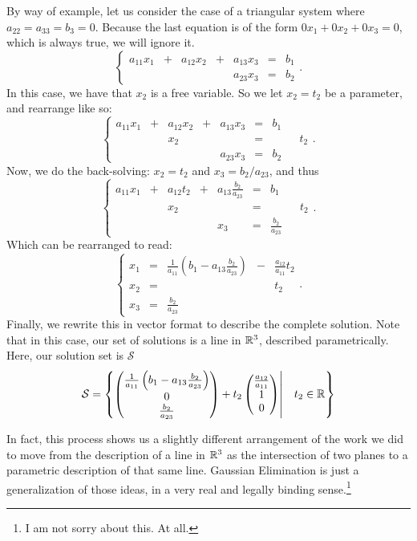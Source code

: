 \documentclass[00-livre-main.tex]{subfiles}
\begin{document}
By way of example, let us consider the case of a triangular system where $a_{22}=a_{33} =b_3=0$. Because the last equation is of the form $0x_1 + 0x_2+0x_3 = 0$, which is always true, we will ignore it.
\[
\left\{\begin{array}{rrrrrrr}
a_{11}x_1 & + & a_{12} x_2 & + & a_{13}x_3 & = & b_1 \\
& &  &  & a_{23}x_3 & = & b_2 
\end{array}\right. .
\]
In this case, we have that $x_2$ is a free variable. So we let $x_2=t_2$ be a parameter, and rearrange like so:
\[
\left\{\begin{array}{rrrrrrrrr}
a_{11}x_1 & + & a_{12}x_2 & + & a_{13}x_3 & = & b_1 &&\\
& & x_2 & & &= & & & t_2  \\
& & & & a_{23}x_3 & = & b_2 &&
\end{array}\right. .
\]
Now, we do the back-solving: $x_2 = t_2$ and $x_3 = b_2 / a_{23}$, and thus
\[
\left\{
\begin{array}{rrrrrrrrr}
a_{11}x_1 & + & a_{12}t_2 & + & a_{13}\frac{b_2}{a_{23}} & = & b_1 &  & \\
& & x_2 & & & = & & & t_2  \\
& & & & x_3 & = & \frac{b_2}{a_{23}} &&
\end{array}\right. .
\]
Which can be rearranged to read:
\[
\left\{
\begin{array}{rrcrr}
x_1 & = & \frac{1}{a_{11}}\left(b_1 -a_{13}\frac{b_2}{a_{23}}\right) & - & \frac{a_{12}}{a_{11}}t_2\\
x_2 & = & & & t_2\\
x_3 & = & \frac{b_2}{a_{23}} &&
\end{array}\right. .
\]
Finally, we rewrite this in vector format to describe the complete solution. Note that in this case, our set of solutions is a line in $\mathbb{R}^3$, described parametrically. Here, our solution set is $\mathcal{S}$
\[
\mathcal{S} = 
\left\{ 
\begin{pmatrix} \frac{1}{a_{11}}\left(b_1 -a_{13}\frac{b_2}{a_{23}}\right) \\ 0 \\ \frac{b_2}{a_{23}}\end{pmatrix} 
+ t_2 \begin{pmatrix} \frac{a_{12}}{a_{11}}\\ 1 \\ 0 \end{pmatrix} \middle| \quad t_2 \in \mathbb{R}  \right\}
\]

In fact, this process shows us a slightly different arrangement of the work we did to move from the description of a line in $\mathbb{R}^3$ as the intersection of two planes to a parametric description of that same line. Gaussian Elimination is just a generalization of those ideas, in a very real and legally binding sense.\footnote{I am not sorry about this. At all.}
\end{document}
